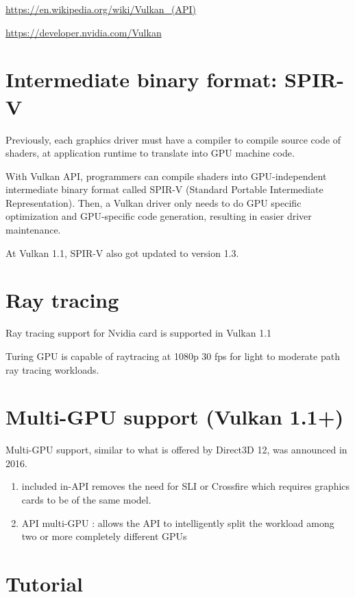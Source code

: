 \url{https://en.wikipedia.org/wiki/Vulkan_(API)}

\url{https://developer.nvidia.com/Vulkan}


\section{Intermediate binary format: SPIR-V}
\label{sec:SPIR-V}

Previously, each graphics driver must have a compiler to compile source code of shaders, 
at application runtime to translate into GPU machine code.

With Vulkan API, programmers can compile shaders into GPU-independent
intermediate binary format called SPIR-V (Standard Portable Intermediate
Representation). Then, a Vulkan driver only needs to do GPU specific
optimization and GPU-specific code generation, resulting in easier driver
maintenance.


At Vulkan 1.1, SPIR-V also got updated to version 1.3.

\section{Ray tracing}

Ray tracing support for Nvidia card is supported in Vulkan 1.1

Turing GPU is capable of raytracing at 1080p 30 fps for light to moderate path
ray tracing workloads.

 

\section{Multi-GPU support (Vulkan 1.1+)}

Multi-GPU support, similar to what is offered by Direct3D 12, was announced in 2016.

\begin{enumerate}
  \item  included in-API removes the need for SLI or Crossfire which requires graphics cards to be of the same model.
  
  \item API multi-GPU : allows the API to intelligently split the workload among two or more completely different GPUs
\end{enumerate}

\section{Tutorial}

